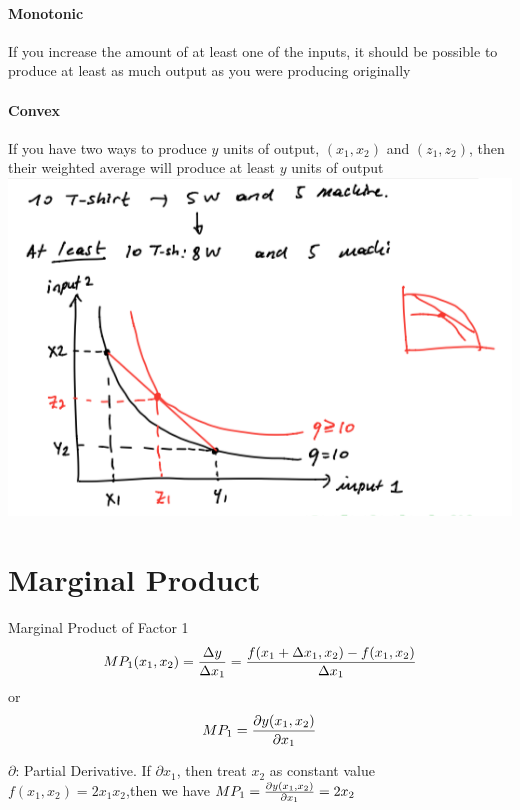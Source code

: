 \documentclass{report}
\begin{document}
\paragraph{Monotonic}If you increase the amount of at least one of the inputs, it should be possible to produce at least as much output as you were producing originally
\paragraph{Convex}If you have two ways to produce $y$ units of output, $(x_1,x_2)$ and $(z_1,z_2)$, then their weighted average will produce at least $y$ units of output
\includegraphics[width = \textwidth]{econ6}
\section{Marginal Product}
\begin{defbox}
Marginal Product of Factor 1
$$MP_1(x_1,x_2)={{\Delta y}\over {\Delta x_1}} = {{f(x_1+\Delta x_1,x_2) - f(x_1,x_2)}\over {\Delta x_1}}$$
or
$$MP_1 = {{\partial y(x_1,x_2)}\over {\partial x_1}}$$
\end{defbox}
$\partial$: Partial Derivative. If $\partial x_1$, then treat $x_2$ as constant value\\$f(x_1,x_2) = 2x_1x_2$,then we have $MP_1 = {{\partial y(x_1,x_2)}\over {\partial x_1}} = 2x_2$
\end{document}
